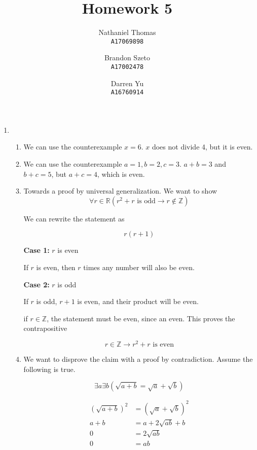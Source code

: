 \documentclass{article}
\title{Homework 5}
\author{
	Nathaniel Thomas\\
	\texttt{A17069898}
	\and
	Brandon Szeto\\
	\texttt{A17002478}
	\and
	Darren Yu\\
	\texttt{A16760914}
}
\newcommand{\R}{\mathbb{R}}
\newcommand{\Z}{\mathbb{Z}}
\begin{document}
\maketitle

\begin{enumerate}
	\item \begin{enumerate}
		      \item We can use the counterexample $x=6$. $x$ does not divide
		            4, but it is even.
		      \item We can use the counterexample $a=1, b=2, c=3$. $a+b = 3$ and
		            $b + c = 5$, but $a+c = 4$, which is even.

		      \item Towards a proof by universal generalization. We want to show
		            $$
			            \forall r \in \R (r^2 + r \text{ is odd} \to r \notin \Z)
		            $$

		            We can rewrite the statement as

		            $$
			            r(r + 1)
		            $$

		            \textbf{Case 1:} $r$ is even

		            If $r$ is even, then $r$ times any number will also be even.

		            \textbf{Case 2:} $r$ is odd

		            If $r$ is odd, $r+1$ is even, and their product will be even.

		            if $r \in \Z$, the statement must be even, since an even.
		            This proves the contrapositive

		            $$
			            r \in \Z \to r^2 + r \text{ is even}
		            $$

		      \item
		            We want to disprove the claim with a proof by contradiction. Assume the following
		            is true.

		            $$
			            \exists a \exists b ( \sqrt{a + b} = \sqrt a + \sqrt b)
		            $$

		            \begin{align*}
			            (\sqrt{a + b})^2 & = (\sqrt a + \sqrt b)^2 \\
			            a + b            & = a + 2 \sqrt{ab} + b   \\
			            0                & = 2 \sqrt{ab}           \\
			            0                & = ab                    \\
		            \end{align*}


\end{enumerate}
\end{enumerate}
\end{document}
